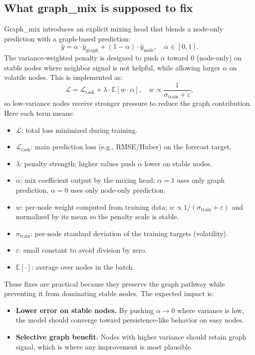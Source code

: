 \documentclass[pdflatex,sn-basic]{sn-jnl}
\begin{document}
\subsection{What graph\_mix is supposed to fix}
Graph\_mix introduces an explicit mixing head that blends a node-only prediction with a
graph-based prediction:
\[
\hat{y} = \alpha \cdot \hat{y}_{\text{graph}} + (1-\alpha) \cdot \hat{y}_{\text{node}},
\quad \alpha \in [0,1].
\]
The variance-weighted penalty is designed to push $\alpha$ toward $0$ (node-only) on stable nodes
where neighbor signal is not helpful, while allowing larger $\alpha$ on volatile nodes. This is implemented as:
\[
\mathcal{L} = \mathcal{L}_{\text{task}} + \lambda \cdot \mathbb{E}[w \cdot \alpha],
\quad w \propto \frac{1}{\sigma_{\text{train}}+\varepsilon},
\]
so low-variance nodes receive stronger pressure to reduce the graph contribution.
Here each term means:
\begin{itemize}
  \item $\mathcal{L}$: total loss minimized during training.
  \item $\mathcal{L}_{\text{task}}$: main prediction loss (e.g., RMSE/Huber) on the forecast target.
  \item $\lambda$: penalty strength; higher values push $\alpha$ lower on stable nodes.
  \item $\alpha$: mix coefficient output by the mixing head; $\alpha=1$ uses only graph prediction,
  $\alpha=0$ uses only node-only prediction.
  \item $w$: per-node weight computed from training data; $w \propto 1/(\sigma_{\text{train}}+\varepsilon)$ and
  normalized by its mean so the penalty scale is stable.
  \item $\sigma_{\text{train}}$: per-node standard deviation of the training targets (volatility).
  \item $\varepsilon$: small constant to avoid division by zero.
  \item $\mathbb{E}[\cdot]$: average over nodes in the batch.
\end{itemize}
These fixes are practical because they preserve the graph pathway while preventing it from
dominating stable nodes. The expected impact is:
\begin{itemize}
  \item \textbf{Lower error on stable nodes.} By pushing $\alpha \rightarrow 0$ where variance is
  low, the model should converge toward persistence-like behavior on easy nodes.
  \item \textbf{Selective graph benefit.} Nodes with higher variance should retain graph signal,
  which is where any improvement is most plausible.
\end{itemize}
\end{document}
